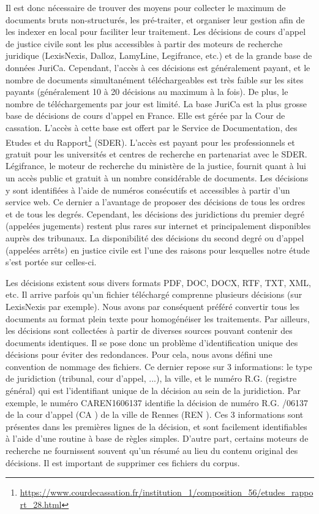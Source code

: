 Il est donc nécessaire de trouver des moyens pour collecter le maximum de documents bruts non-structurés, les pré-traiter, et organiser leur gestion afin de les indexer en local pour faciliter leur traitement. Les décisions de cours d'appel de justice civile sont les plus accessibles à partir des moteurs de recherche juridique (LexisNexis, Dalloz, LamyLine, Legifrance, etc.) et de la grande base de données JuriCa. Cependant, l'accès à ces décisions est généralement payant, et le nombre de documents simultanément téléchargeables est très faible sur les sites payants (généralement 10 à 20 décisions au maximum à la fois). De plus, le nombre de téléchargements par jour est limité. La base JuriCa est la plus grosse base de décisions de cours d'appel en France. Elle est gérée par la Cour de cassation. L'accès à cette base est offert par le Service de Documentation, des Etudes et du Rapport\footnote{\url{https://www.courdecassation.fr/institution_1/composition_56/etudes_rapport_28.html}} (SDER). L'accès est payant pour les professionnels et gratuit pour les universités et centres de recherche en partenariat avec le SDER. Légifrance, le moteur de recherche du ministère de la justice, fournit quant à lui un accès public et gratuit à un nombre considérable de documents. Les décisions y sont identifiées à l'aide de numéros consécutifs et accessibles à partir d'un service web. Ce dernier a l'avantage de proposer des décisions de tous les ordres et de tous les degrés. Cependant, les décisions des juridictions du premier degré (appelées jugements) restent plus rares sur internet et principalement disponibles auprès des tribunaux.  La disponibilité des décisions du second degré ou d'appel (appelées arrêts) en justice civile est l'une des raisons pour lesquelles notre étude s'est portée sur celles-ci.

Les décisions existent sous divers formats PDF, DOC, DOCX, RTF, TXT, XML, etc. Il arrive parfois qu'un fichier téléchargé comprenne plusieurs décisions (sur LexisNexis par exemple). Nous avons par conséquent préféré convertir tous les documents au format plein texte pour homogénéiser les traitements. Par ailleurs, les décisions sont collectées à partir de diverses sources pouvant contenir des documents identiques. Il se pose donc un problème d'identification unique des décisions pour éviter des redondances. Pour cela, nous avons défini une convention de nommage des fichiers. Ce dernier repose sur 3 informations: le type de juridiction (tribunal, cour d'appel, ...), la ville, et le numéro R.G. (registre général) qui est l'identifiant unique de la décision au sein de la juridiction. Par exemple, le numéro \og CAREN1606137 \fg{} identifie la décision de numéro R.G. /06137 \fg{} de la cour d'appel (\og CA \fg{}) de la ville de Rennes (\og REN \fg{}). Ces 3 informations sont présentes dans les premières lignes de la décision, et sont facilement identifiables à l'aide d'une routine à base de règles simples. D'autre part, certains moteurs de recherche ne fournissent souvent qu'un résumé au lieu du contenu original des décisions. Il est important de supprimer ces fichiers du corpus.

